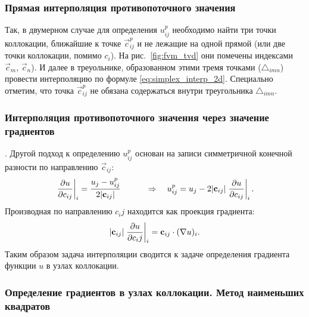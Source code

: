\subsubsection{Прямая интерполяция противопоточного значения}
\label{sec:direct_interpolate_up}
Так, в двумерном случае для определения $u^p_{ij}$
необходимо найти три точки коллокации,
ближайшие к точке $\vec c^p_{ij}$ и не лежащие на одной прямой (или две точки коллокации, помимо $c_i$). На рис.~\ref{fig:fvm_tvd}
они помечены индексами $\vec c_m$, $\vec c_n$).
И далее в треуольнике, образованном этими тремя
точками ($\triangle_{imn}$) провести
интерполяцию
по формуле \cref{eq:simplex_interp_2d}.
Специально отметим, что точка $\vec c^p_{ij}$
не обязана содержаться внутри 
треугольника $\triangle_{imn}$.

\subsubsection{Интерполяция противопоточного значения через значение градиентов}
\label{sec:grad_inteprolate_up}.
Другой подход к определению $u^p_{ij}$ основан на записи симметричной конечной разности
по направлению $\vec c_{ij}$:
\begin{equation*}
\left.\frac{\partial u}{\partial c_{ij}}\right|_i = \frac{u_j - u^p_{ij}}{2|\boldsymbol{\rm c}_{ij}|} \qquad \quad\Rightarrow\quad
u_{ij}^p = u_j - 2 |\boldsymbol{\rm c}_{ij}| \left. \frac{\partial u}{\partial c_{ij}}\right|_i.
\end{equation*}
Производная по направлению $c_ij$ находится как проекция градиента:
\begin{equation*}
|\boldsymbol{\rm c}_{ij}| \left.\frac{\partial u}{\partial c_ij}\right|_i = \boldsymbol{\rm c}_{ij} \cdot (\nabla u)_i.
\end{equation*}
Таким образом задача интерполяции сводится к задаче определения градиента функции
$u$ в узлах коллокации.

\subsubsection{Определение градиентов в узлах коллокации. Метод наименьших квадратов}

